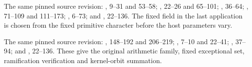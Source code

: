 The same pinned source revision:
, 9--31 and 53--58;
, 22--26 and 65--101;
, 36--64;
, 71--109 and 111--173;
, 6--73; and
, 22--136.
The fixed field in the last application is chosen from the
fixed primitive character before the host parameters vary.

The same pinned source revision:
,
148--192 and 206--219;
, 7--10 and 22--41;
, 37--94; and
, 22--136.
These give the original arithmetic family, fixed exceptional
set, ramification verification and kernel-orbit summation.
